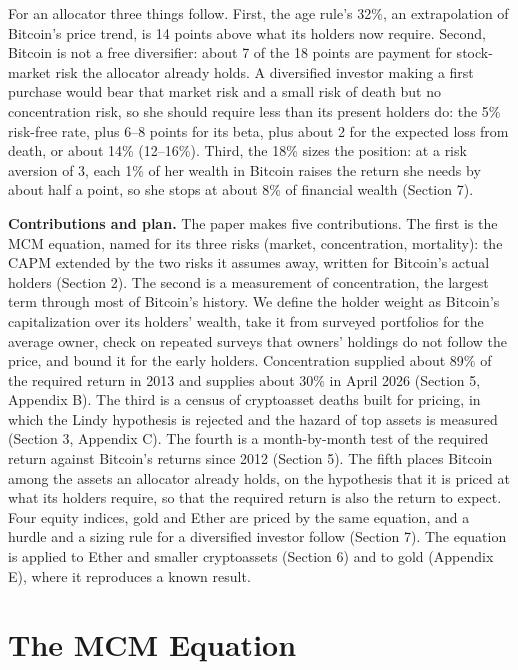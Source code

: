 \documentclass[11pt]{article}
\begin{document}
For an allocator three things follow. First, the age rule's 32\%, an extrapolation of Bitcoin's price trend, is 14 points above what its holders now require. Second, Bitcoin is not a free diversifier: about 7 of the 18 points are payment for stock-market risk the allocator already holds. A diversified investor making a first purchase would bear that market risk and a small risk of death but no concentration risk, so she should require less than its present holders do: the 5\% risk-free rate, plus 6--8 points for its beta, plus about 2 for the expected loss from death, or about 14\% (12--16\%). Third, the 18\% sizes the position: at a risk aversion of 3, each 1\% of her wealth in Bitcoin raises the return she needs by about half a point, so she stops at about 8\% of financial wealth (Section 7).

\textbf{Contributions and plan.} The paper makes five contributions. The first is the MCM equation, named for its three risks (market, concentration, mortality): the CAPM extended by the two risks it assumes away, written for Bitcoin's actual holders (Section 2). The second is a measurement of concentration, the largest term through most of Bitcoin's history. We define the holder weight as Bitcoin's capitalization over its holders' wealth, take it from surveyed portfolios for the average owner, check on repeated surveys that owners' holdings do not follow the price, and bound it for the early holders. Concentration supplied about 89\% of the required return in 2013 and supplies about 30\% in April 2026 (Section 5, Appendix B). The third is a census of cryptoasset deaths built for pricing, in which the Lindy hypothesis is rejected and the hazard of top assets is measured (Section 3, Appendix C). The fourth is a month-by-month test of the required return against Bitcoin's returns since 2012 (Section 5). The fifth places Bitcoin among the assets an allocator already holds, on the hypothesis that it is priced at what its holders require, so that the required return is also the return to expect. Four equity indices, gold and Ether are priced by the same equation, and a hurdle and a sizing rule for a diversified investor follow (Section 7). The equation is applied to Ether and smaller cryptoassets (Section 6) and to gold (Appendix E), where it reproduces a known result.

\section{The MCM Equation}
\end{document}
